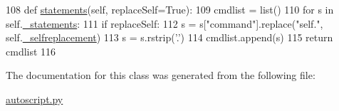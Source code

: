 \begin{DoxyCode}
108     \textcolor{keyword}{def }\hyperlink{classsoftware_1_1chipwhisperer_1_1common_1_1api_1_1autoscript_1_1SmartStatements_aaf3e2a165ea5a5e49eda591f91ef294d}{statements}(self, replaceSelf=True):
109         cmdlist = list()
110         \textcolor{keywordflow}{for} s \textcolor{keywordflow}{in} self.\hyperlink{classsoftware_1_1chipwhisperer_1_1common_1_1api_1_1autoscript_1_1SmartStatements_af10879e7ae478182b70275c18a0af4f8}{\_statements}:
111             \textcolor{keywordflow}{if} replaceSelf:
112                 s = s[\textcolor{stringliteral}{"command"}].replace(\textcolor{stringliteral}{"self."}, self.\hyperlink{classsoftware_1_1chipwhisperer_1_1common_1_1api_1_1autoscript_1_1SmartStatements_a937b4e52cf69da12ff77746d07d60be8}{\_selfreplacement})
113                 s = s.rstrip(\textcolor{stringliteral}{'.'})
114             cmdlist.append(s)
115         \textcolor{keywordflow}{return} cmdlist
116     
\end{DoxyCode}


The documentation for this class was generated from the following file\+:\begin{DoxyCompactItemize}
\item 
\hyperlink{autoscript_8py}{autoscript.\+py}\end{DoxyCompactItemize}
